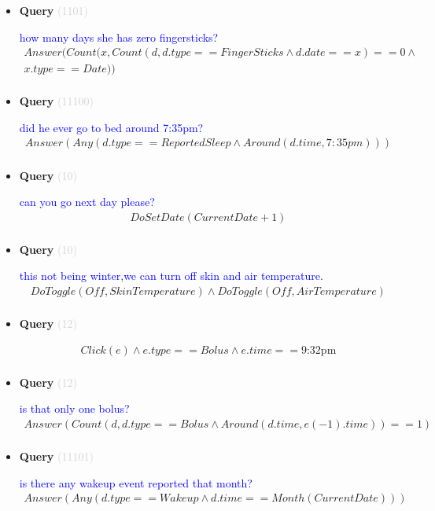 \documentclass[11pt]{article}
\newcommand{\key}[1]{\textcolor{lightgray}{#1}}
\newcounter{CQuery}
\begin{document}
\begin{itemize}
\item
\textbf{Query\theCQuery} \key{(1101)} \addtocounter{CQuery}{1}
\textcolor{blue}{ how many days she has zero fingersticks? }
\begin{multline*}
Answer(Count(x, Count(d, d.type==FingerSticks \wedge d.date==x)==0 \wedge \\ 
x.type==Date)) \\ 
\end{multline*}


\item
\textbf{Query\theCQuery} \key{(11100)} \addtocounter{CQuery}{1}
\textcolor{blue}{ did he ever go to bed around 7:35pm? }
\begin{multline*}
Answer(Any(d.type==ReportedSleep \wedge Around(d.time, 7:35pm))) \\ 
\end{multline*}


\item
\textbf{Query\theCQuery} \key{(10)} \addtocounter{CQuery}{1}
\textcolor{blue}{ can you go next day please? }
\begin{multline*}
DoSetDate(CurrentDate + 1) \\ 
\end{multline*}


\item
\textbf{Query\theCQuery} \key{(10)} \addtocounter{CQuery}{1}
\textcolor{blue}{ this not being winter,we can turn off skin and air temperature. }
\begin{multline*}
DoToggle(Off, SkinTemperature) \wedge DoToggle(Off, AirTemperature) \\ 
\end{multline*}


\item
\textbf{Query\theCQuery} \key{(12)} \addtocounter{CQuery}{1}
\textcolor{blue}{  }
\begin{multline*}
Click(e) \wedge e.type == Bolus \wedge e.time==\mbox{9:32pm} \\ 
\end{multline*}


\item
\textbf{Query\theCQuery} \key{(12)} \addtocounter{CQuery}{1}
\textcolor{blue}{ is that only one bolus? }
\begin{multline*}
Answer(Count(d, d.type==Bolus \wedge Around(d.time, e(-1).time))==1) \\ 
\end{multline*}


\item
\textbf{Query\theCQuery} \key{(11101)} \addtocounter{CQuery}{1}
\textcolor{blue}{ is there any wakeup event reported that month? }
\begin{multline*}
Answer(Any(d.type==Wakeup \wedge d.time==Month(CurrentDate))) \\ 
\end{multline*}



\end{itemize}
\end{document}
